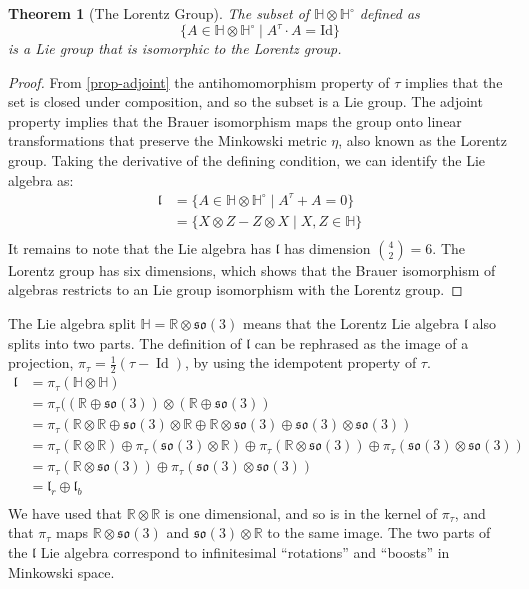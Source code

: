 \documentclass{amsart}
\newcommand{\HH}{\mathbb{H}}
\newcommand{\RR}{\mathbb{R}}
\newcommand{\so}{\mathfrak{so}}
\newcommand{\lorentz}{\mathfrak{l}}
\newcommand{\Id}{\operatorname{Id}}
\newtheorem{theorem}{Theorem}
\begin{document}
\begin{theorem}[The Lorentz Group]
  The subset of $ \HH\otimes \HH^\circ$ defined as
  $$ \{ A \in \HH\otimes\HH^\circ \mid A^\tau \cdot A = \mathrm{Id} \} $$
  is a Lie group that is isomorphic to the Lorentz group.
\end{theorem}

\begin{proof}
From \ref{prop-adjoint} the antihomomorphism property of $\tau$ implies that the set is closed under composition, and so the subset is a Lie group.
The adjoint property implies that the Brauer isomorphism maps the group onto linear transformations that preserve the Minkowski metric $\eta$, also known as the Lorentz group.
Taking the derivative of the defining condition, we can identify the Lie algebra as:
  \begin{align*}
    \lorentz &= \{ A \in \HH\otimes\HH^\circ \mid A^\tau + A = 0 \} \\
     &= \{ X \otimes Z - Z\otimes X \mid X, Z \in \HH \} \\
  \end{align*}
  It remains to note that the Lie algebra has $\lorentz$ has dimension ${4 \choose 2} = 6$.
  The Lorentz group has six dimensions, which shows that the Brauer isomorphism of algebras restricts to an Lie group isomorphism with the Lorentz group.

\end{proof}

The Lie algebra split $\HH=\RR\otimes\so(3)$ means that the Lorentz Lie algebra $\lorentz$ also splits into two parts.
The definition of $\lorentz$ can be rephrased as the image of a projection, $\pi_\tau = \frac{1}{2}(\tau - \Id)$, by using the idempotent property of $\tau$.
\begin{align*}
  \lorentz &= \pi_\tau(\HH\otimes\HH) \\
  &= \pi_\tau((\RR\oplus\so(3))\otimes(\RR\oplus\so(3)) \\
  &= \pi_\tau(\RR\otimes\RR \oplus \so(3)\otimes\RR \oplus \RR\otimes\so(3) \oplus \so(3)\otimes\so(3)) \\
  &= \pi_\tau(\RR\otimes\RR) \oplus \pi_\tau(\so(3)\otimes\RR) \oplus \pi_\tau(\RR\otimes\so(3)) \oplus \pi_\tau(\so(3)\otimes\so(3)) \\
  &= \pi_\tau(\RR\otimes\so(3)) \oplus \pi_\tau(\so(3)\otimes\so(3)) \\
  &= \lorentz_r \oplus \lorentz_b \\
\end{align*}
We have used that $\RR\otimes\RR$ is one dimensional, and so is in the kernel of $\pi_\tau$, and that $\pi_\tau$ maps $\RR\otimes\so(3)$ and $\so(3)\otimes\RR$ to the same image.
The two parts of the $\lorentz$ Lie algebra correspond to infinitesimal ``rotations'' and ``boosts'' in Minkowski space.
\end{document}
